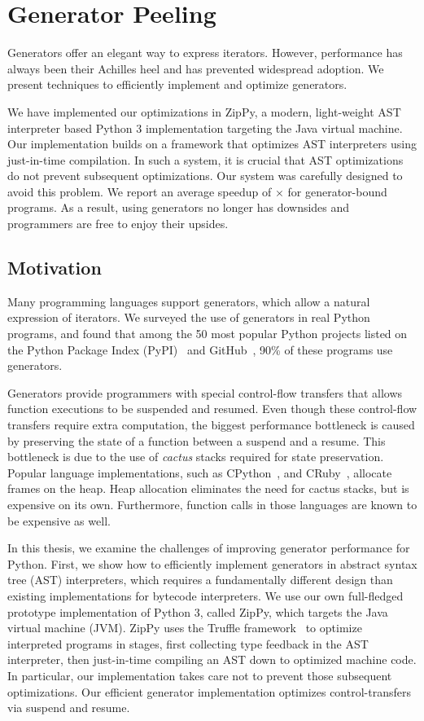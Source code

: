 \chapter{Generator Peeling}
\label{chp:ch5-peeling}

Generators offer an elegant way to express iterators.
However, performance has always been their Achilles heel and has prevented widespread adoption.
We present techniques to efficiently implement and optimize generators.

We have implemented our optimizations in ZipPy, a modern, light-weight AST interpreter based Python 3 implementation targeting the Java virtual machine.
Our implementation builds on a framework that optimizes AST interpreters using just-in-time compilation.
In such a system, it is crucial that AST optimizations do not prevent subsequent optimizations.
Our system was carefully designed to avoid this problem.
We report an average speedup of \peelingSpeedup{}$\times$ for generator-bound programs.
As a result, using generators no longer has downsides and programmers are free to enjoy their upsides.

\section{Motivation}

Many programming languages support generators, which allow a natural expression of iterators.
We surveyed the use of generators in real Python programs, and found that among the 50 most popular Python projects
listed on the Python Package Index (PyPI)~\cite{pypi} and GitHub~\cite{github}, 90\% of these programs use generators.

Generators provide programmers with special control-flow transfers that allows function executions to be suspended and resumed.
Even though these control-flow transfers require extra computation, the biggest performance bottleneck is caused by preserving the state of a function between a suspend and a resume.
This bottleneck is due to the use of \emph{cactus} stacks required for state preservation.
Popular language implementations, such as CPython~\cite{python}, and CRuby~\cite{ruby}, allocate frames on the heap.
Heap allocation eliminates the need for cactus stacks, but is expensive on its own.
Furthermore, function calls in those languages are known to be expensive as well.

In this thesis, we examine the challenges of improving generator performance for Python.
First, we show how to efficiently implement generators in abstract syntax tree (AST) interpreters,
which requires a fundamentally different design than existing implementations for bytecode interpreters.
We use our own full-fledged prototype implementation of Python 3, called ZipPy,
which targets the Java virtual machine (JVM).
ZipPy uses the Truffle framework~\cite{Wurthinger+13} to optimize interpreted programs in stages, first collecting type feedback in the AST interpreter,
then just-in-time compiling an AST down to optimized machine code.
In particular, our implementation takes care not to prevent those subsequent optimizations.
Our efficient generator implementation optimizes control-transfers via suspend and resume.

